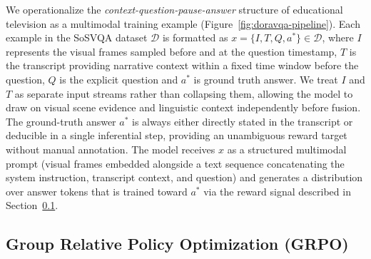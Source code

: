 \documentclass{article}
\begin{document}

We operationalize the \textit{context-question-pause-answer} structure of educational television as a multimodal training example (Figure~\ref{fig:doravqa-pipeline}). Each example in the SoSVQA dataset $\mathcal{D}$ is formatted as $x = \{I, T, Q, a^*\} \in \mathcal{D}$, where $I$ represents the visual frames sampled before and at the question timestamp, $T$ is the transcript providing narrative context within a fixed time window before the question, $Q$ is the explicit question and $a^*$ is ground truth answer. We treat $I$ and $T$ as separate input streams rather than collapsing them, allowing the model to draw on visual scene evidence and linguistic context independently before fusion. The ground-truth answer $a^*$ is always either directly stated in the transcript or deducible in a single inferential step, providing an unambiguous reward target without manual annotation. The model receives $x$ as a structured multimodal prompt (visual frames embedded alongside a text sequence concatenating the system instruction, transcript context, and question) and generates a distribution over answer tokens that is trained toward $a^*$ via the reward signal described in Section~\ref{sec:grpo}.



\subsection{Group Relative Policy Optimization (GRPO)}
\label{sec:grpo}
\end{document}
